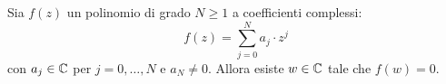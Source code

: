 \begin{theorem}
\label{th:fondamentale_algebra}
%
%
Sia $f(z)$ un polinomio di grado $N\ge 1$ a coefficienti complessi:
\[
  f(z) = \sum_{j=0}^N a_j \cdot z^j
\]
con $a_j\in {\mathbb C}$ per $j=0,\dots,N$ e $a_N \neq 0$.
Allora esiste $w\in {\mathbb C}$ tale che $f(w) = 0$.
\end{theorem}
%
\begin{comment}

\begin{proof}
Osserviamo innanzitutto che $\abs{f(z)}$ è coerciva cioè che
se $z_n \to \infty$ allora $\abs{f(z_n)}\to +\infty$.
Infatti si ha
\begin{align*}
  \abs{f(z_n)}
  &= \abs{\sum_{j=0}^N a_j z_n^j}
  = \abs{a_N z_n^N  + \sum_{j=0}^{N-1} a_j z_n^j}\\
  &= \abs{z_n}^N \cdot \abs{a_N + \sum_{j=0}^{N-1} \frac{a_j}{z_n^{N-j}}}
  \to +\infty
\end{align*}
se $z_n \to \infty$.

Sappiamo che tutti i polinomi sono funzioni continue in quanto somme di prodotti di funzioni continue e il modulo è anch'esso una funzione continua dunque $\abs{f(z)}$ è certamente una funzione continua.

Dunque possiamo applicare il teorema di esistenza del minimo per le funzioni coercive: esiste $w\in \CC$ tale che $\abs{f(w)}$ è minimo.

Per concludere il teorema basterà dimostrare che $f(w)=0$.
L'idea che vogliamo sviluppare è che i polinomi complessi se assumono un valore
$f(w)$ in un punto $w\in \CC$ allora assumono anche tutti i valori vicini
ad esso in quanto \emph{localmente} il polinomio assomiglia ad una potenza $z^n$
e l'equazione $z^n=c$ ha sempre soluzione, come abbiamo già visto.
Dunque vicino a $w$ ci saranno dei punti in cui $f$ assume valori che in modulo sono minori a $f(w)$: a meno che non sia proprio $f(w)=0$, nel qual caso ovviamente non è possibile avere numeri con modulo inferiore a $0$.
Per semplificare la notazione andremo a traslare e riscalare il polinomio $f$ in modo che il punto di minimo vada in $0$ e il valore con modulo minimo diventi $1$.

Supponiamo per assurdo che sia $f(w)\neq 0$ e consideriamo il polinomio ausiliario
\[
  g(z) = \frac{f(w+z)}{f(w)}.
\]
Andremo a dimostrare che esiste uno $z\neq 0$ tale che $\abs{g(z)}<1$:
questo ci porterà all'assurdo in quanto si avrebbe
\[
\abs{f(w+z)} = \abs{f(w)} \cdot \abs{g(z)} < \abs{f(w)}
\]
e quindi $w$ non sarebbe un punto di minimo per $\abs{f}$.


\end{comment}
